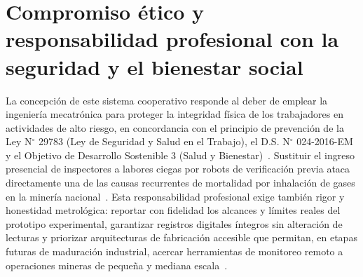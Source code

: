 \section{Compromiso ético y responsabilidad profesional con la seguridad y el bienestar social}

La concepción de este sistema cooperativo responde al deber de emplear la ingeniería mecatrónica para proteger la integridad física de los trabajadores en actividades de alto riesgo, en concordancia con el principio de prevención de la Ley N$^\circ$ 29783 (Ley de Seguridad y Salud en el Trabajo), el D.S. N$^\circ$ 024-2016-EM y el Objetivo de Desarrollo Sostenible 3 (Salud y Bienestar)~\cite{MINEM_DS024_2016}. Sustituir el ingreso presencial de inspectores a labores ciegas por robots de verificación previa ataca directamente una de las causas recurrentes de mortalidad por inhalación de gases en la minería nacional~\cite{MINEM_Yanaquihua_2023}. Esta responsabilidad profesional exige también rigor y honestidad metrológica: reportar con fidelidad los alcances y límites reales del prototipo experimental, garantizar registros digitales íntegros sin alteración de lecturas y priorizar arquitecturas de fabricación accesible que permitan, en etapas futuras de maduración industrial, acercar herramientas de monitoreo remoto a operaciones mineras de pequeña y mediana escala~\cite{OSINERGMIN_BoletinGSM_2020}.
